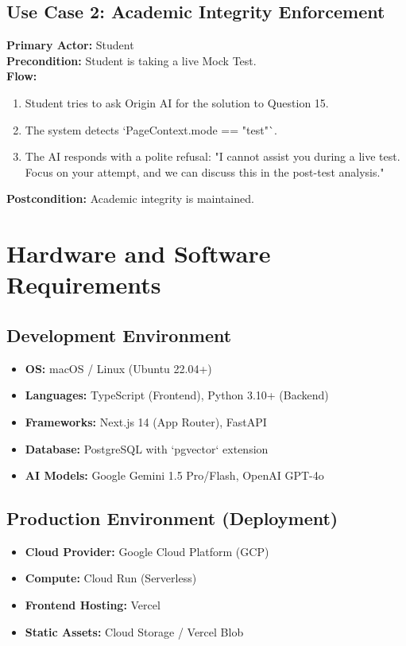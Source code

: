 \subsection{Use Case 2: Academic Integrity Enforcement}
\textbf{Primary Actor:} Student \\
\textbf{Precondition:} Student is taking a live Mock Test. \\
\textbf{Flow:}
\begin{enumerate}
    \item Student tries to ask Origin AI for the solution to Question 15.
    \item The system detects `PageContext.mode == "test"`.
    \item The AI responds with a polite refusal: "I cannot assist you during a live test. Focus on your attempt, and we can discuss this in the post-test analysis."
\end{enumerate}
\textbf{Postcondition:} Academic integrity is maintained.

\section{Hardware and Software Requirements}

\subsection{Development Environment}
\begin{itemize}
    \item \textbf{OS:} macOS / Linux (Ubuntu 22.04+)
    \item \textbf{Languages:} TypeScript (Frontend), Python 3.10+ (Backend)
    \item \textbf{Frameworks:} Next.js 14 (App Router), FastAPI
    \item \textbf{Database:} PostgreSQL with `pgvector` extension
    \item \textbf{AI Models:} Google Gemini 1.5 Pro/Flash, OpenAI GPT-4o
\end{itemize}

\subsection{Production Environment (Deployment)}
\begin{itemize}
    \item \textbf{Cloud Provider:} Google Cloud Platform (GCP)
    \item \textbf{Compute:} Cloud Run (Serverless)
    \item \textbf{Frontend Hosting:} Vercel
    \item \textbf{Static Assets:} Cloud Storage / Vercel Blob
\end{itemize}

